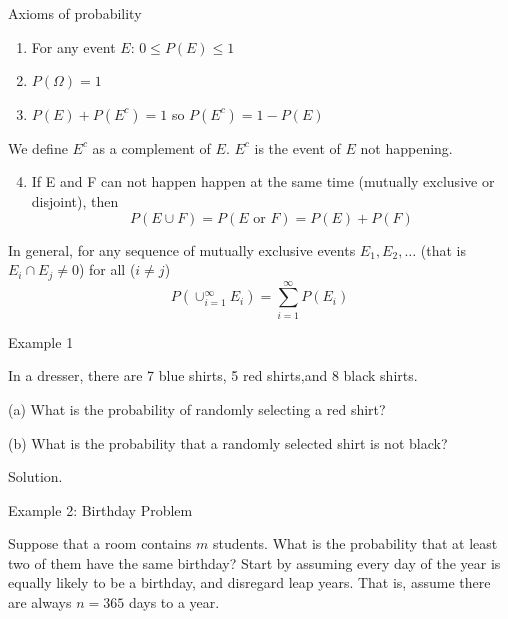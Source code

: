 \documentclass[
  ignorenonframetext,
]{beamer}
\providecommand{\tightlist}{%
  \setlength{\itemsep}{0pt}\setlength{\parskip}{0pt}}
\begin{document}
\begin{frame}{Axioms of probability}
\protect\hypertarget{axioms-of-probability}{}
\begin{enumerate}
\item
  For any event \(E\): \(0\leq P(E) \leq 1\)
\item
  \(P(\Omega)=1\)
\item
  \(P(E) + P(E^{c})=1\) so \(P(E^c)=1-P(E)\)
\end{enumerate}

We define \(E^{c}\) as a complement of \(E\). \(E^{c}\) is the event of
\(E\) not happening.

\begin{enumerate}
\setcounter{enumi}{3}
\tightlist
\item
  If E and F can not happen happen at the same time (mutually exclusive
  or disjoint), then \[P(E \cup F)=P(E \text{ or } F)=P(E) + P(F)\]
\end{enumerate}

In general, for any sequence of mutually exclusive events
\(E_1, E_2, \ldots\) (that is \(E_i \cap E_j \neq 0\)) for all
(\(i\neq j\))
\[P\left(\cup_{i=1}^{\infty} E_i\right)=\sum_{i=1}^{\infty} P(E_i)\]
\end{frame}

\begin{frame}{Example 1}
\protect\hypertarget{example-1}{}
\begin{tcolorbox}

In a dresser, there are 7 blue shirts, 5 red shirts,and 8 black shirts.

(a) What is the probability of randomly selecting a red shirt?

(b) What is the probability that a randomly selected shirt is not black?

\end{tcolorbox}

\pause

\begin{tcolorbox}
Solution.

\vspace{30mm}

\end{tcolorbox}
\end{frame}

\begin{frame}{Example 2: Birthday Problem}
\protect\hypertarget{example-2-birthday-problem}{}
\begin{tcolorbox}

Suppose that a room contains $m$ students. What is the probability that at least two of them have the same birthday? Start by assuming every day of the year is equally likely to be a birthday, and disregard leap years. That is, assume there are always $n=365$ days to a year.

\end{tcolorbox}
\end{frame}
\end{document}
